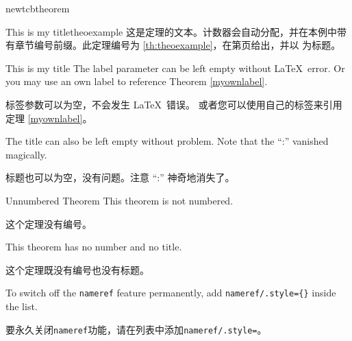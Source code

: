 \begin{docCommand}[doc updated=2016-06-22]{newtcbtheorem}{}
\begin{dispExample}
\begin{mytheo}{This is my title}{theoexample}
这是定理的文本。计数器会自动分配，并在本例中带有章节编号前缀。此定理编号为%
\ref{th:theoexample}，在第\pageref{th:theoexample}页给出，并以%
\flqq{}\frqq 为标题。
\end{mytheo}
\end{dispExample}

\begin{dispExample}
\begin{mytheo}[label=myownlabel]{This is my title}{}
The label parameter can be left empty without \LaTeX\ error.
Or you may use an own label to reference Theorem \ref{myownlabel}.

标签参数可以为空，不会发生 \LaTeX\ 错误。 或者您可以使用自己的标签来引用定理 \ref{myownlabel}。
\end{mytheo}
\end{dispExample}

\begin{dispExample}
\begin{mytheo}{}{}
The title can also be left empty without problem. Note that the \enquote{:}
vanished magically.

标题也可以为空，没有问题。注意 \enquote{:} 神奇地消失了。
\end{mytheo}
\end{dispExample}

\begin{dispExample}
\begin{mytheo*}{Unnumbered Theorem}
This theorem is not numbered.

这个定理没有编号。
\end{mytheo*}
\end{dispExample}

\begin{dispExample}
\begin{mytheo*}{}
This theorem has no number and no title.

这个定理既没有编号也没有标题。
\end{mytheo*}
\end{dispExample}

\begin{marker}
To switch off the \texttt{nameref} feature permanently, add
\mbox{\texttt{nameref/.style=\{\}}} inside the  list.

要永久关闭\texttt{nameref}功能，请在列表中添加\mbox{\texttt{nameref/.style={}}}。
\end{marker}

\end{docCommand}



